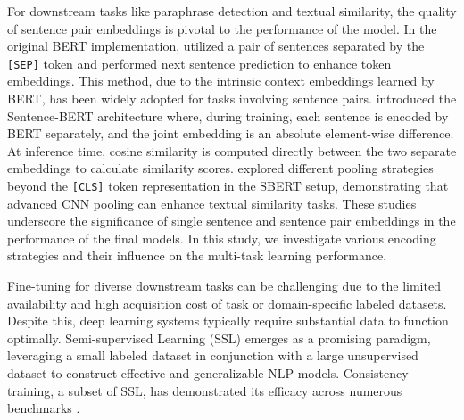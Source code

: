 \documentclass{article}
\begin{document}
For downstream tasks like paraphrase detection and textual similarity, the quality of 
sentence pair embeddings is pivotal to the performance of the model. In the original 
BERT implementation, \cite{devlin2019bert} utilized a pair of sentences separated by 
the \texttt{[SEP]} token and performed next sentence prediction to enhance token 
embeddings. This method, due to the intrinsic context embeddings learned by BERT, has 
been widely adopted for tasks involving sentence pairs.
\cite{reimers2019sentencebert} introduced the Sentence-BERT architecture where, during 
training, each sentence is encoded by BERT separately, and the joint embedding is an 
absolute element-wise difference. At inference time, cosine similarity is computed 
directly between the two separate embeddings to calculate similarity scores.
\cite{choi2021eval} explored different pooling strategies beyond the \texttt{[CLS]} token 
representation in the SBERT setup, demonstrating that advanced CNN pooling can enhance 
textual similarity tasks. These studies underscore the significance of single sentence 
and sentence pair embeddings in the performance of the final models.
In this study, we investigate various encoding strategies and their influence on 
the multi-task learning performance.

Fine-tuning for diverse downstream tasks can be challenging due to the limited availability 
and high acquisition cost of task or domain-specific labeled datasets. Despite this, 
deep learning systems typically require substantial data to function optimally. Semi-supervised 
Learning (SSL) emerges as a promising paradigm, leveraging a small labeled dataset in 
conjunction with a large unsupervised dataset to construct effective and generalizable 
NLP models. Consistency training, a subset of SSL, has demonstrated its efficacy across 
numerous benchmarks \cite{ctNIPS2014_66be31e4,ctrasmus2015semisupervised,ctlaine2017temporal,cttarvainen2018mean}.
\end{document}
